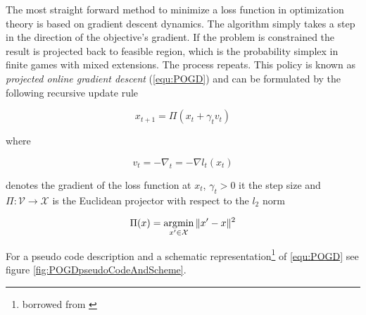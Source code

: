 The most straight forward method to minimize a loss function in optimization theory is based on gradient descent dynamics. The algorithm simply takes a step in the direction of the objective's gradient. If the problem is constrained the result is projected back to feasible region, which is the probability simplex in finite games with mixed extensions. The process repeats. This policy is known as \textit{projected online gradient descent} (\ref{equ:POGD}) and can be formulated by the following recursive update rule

\begin{equation}
   \tag{POGD}
        x_{t+1} = \Pi(x_t + \gamma_t v_t)
   \label{equ:POGD}
\end{equation}

where

\begin{equation*}
    v_t = -\nabla_t = -\nabla l_t(x_t)
\end{equation*}

denotes the gradient of the loss function at $x_t$, $\gamma_t > 0 $ it the step size and $\Pi: \mathcal{V} \to \mathcal{X}$ is the Euclidean projector with respect to the $l_2$ norm

\begin{equation}
    \Pi(x) = \operatorname*{\arg\!\min}_{x'\in \mathcal{X}}\|x'-x\|^{2}
    \label{equ:gradient}
\end{equation}

For a pseudo code description and a schematic representation\footnote{borrowed from \cite[Chapter 2]{HDRmertikopoulos}} of \ref{equ:POGD} see figure \ref{fig:POGDpseudoCodeAndScheme}.


